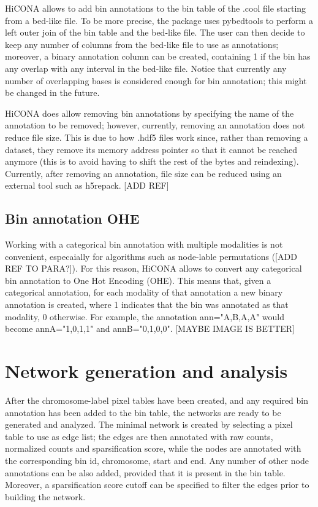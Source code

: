 HiCONA allows to add bin annotations to the bin table of the .cool file starting from a bed-like file. To be more precise, the package uses pybedtools to perform a left outer join of the bin table and the bed-like file. The user can then decide to keep any number of columns from the bed-like file to use as annotations; moreover, a binary annotation column can be created, containing 1 if the bin has any overlap with any interval in the bed-like file. Notice that currently any number of overlapping bases is considered enough for bin annotation; this might be changed in the future.

HiCONA does allow removing bin annotations by specifying the name of the annotation to be removed; however, currently, removing an annotation does not reduce file size. This is due to how .hdf5 files work since, rather than removing a dataset, they remove its memory address pointer so that it cannot be reached anymore (this is to avoid having to shift the rest of the bytes and reindexing). Currently, after removing an annotation, file size can be reduced using an external tool such as h5repack. [ADD REF]

\subsection{Bin annotation OHE}

Working with a categorical bin annotation with multiple modalities is not convenient, especaially for algorithms such as node-lable permutations ([ADD REF TO PARA?]). For this reason, HiCONA allows to convert any categorical bin annotation to One Hot Encoding (OHE). This means that, given a categorical annotation, for each modality of that annotation a new binary annotation is created, where 1 indicates that the bin was annotated as that modality, 0 otherwise. For example, the annotation ann="A,B,A,A" would become annA="1,0,1,1" and annB="0,1,0,0". [MAYBE IMAGE IS BETTER]

\section{Network generation and analysis}

After the chromosome-label pixel tables have been created, and any required bin annotation has been added to the bin table, the networks are ready to be generated and analyzed. The minimal network is created by selecting a pixel table to use as edge list; the edges are then annotated with raw counts, normalized counts and sparsification score, while the nodes are annotated with the corresponding bin id, chromosome, start and end. Any number of other node annotations can be also added, provided that it is present in the bin table. Moreover, a sparsification score cutoff can be specified to filter the edges prior to building the network.

